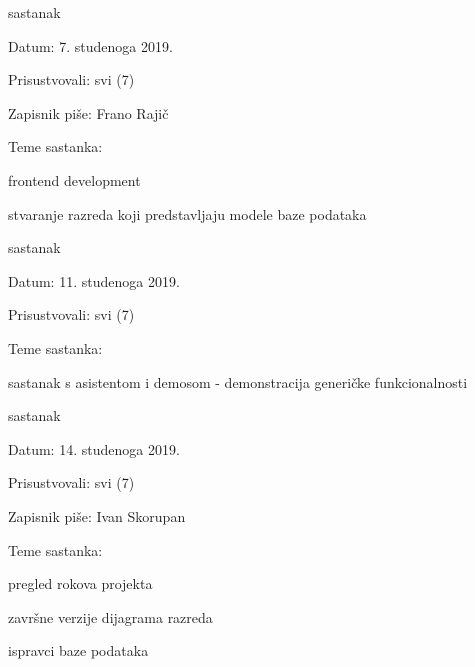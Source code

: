 \begin{packed_enum}
			\item  sastanak
			\item[] \begin{packed_item}
				\item Datum: 7. studenoga 2019.
				\item Prisustvovali: svi (7)
				\item Zapisnik piše: Frano Rajič
				\item Teme sastanka:
				\begin{packed_item}
					\item frontend development
					\item stvaranje razreda koji predstavljaju modele baze podataka
				\end{packed_item}
			\end{packed_item}
		
			\pagebreak
		
			\item  sastanak
			\item[] \begin{packed_item}
				\item Datum: 11. studenoga 2019.
				\item Prisustvovali: svi (7)
				\item Teme sastanka:
				\begin{packed_item}
					\item sastanak s asistentom i demosom - demonstracija generičke funkcionalnosti
				\end{packed_item}
			\end{packed_item}
		
		
			\item  sastanak
			\item[] \begin{packed_item}
				\item Datum: 14. studenoga 2019.
				\item Prisustvovali: svi (7)
				\item Zapisnik piše: Ivan Skorupan
				\item Teme sastanka:
				\begin{packed_item}
					\item pregled rokova projekta
					\item završne verzije dijagrama razreda
					\item ispravci baze podataka
				\end{packed_item}
			\end{packed_item}
			
			
		\end{packed_enum}
		
